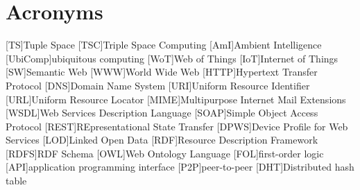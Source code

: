 


\chapter*{Acronyms}

\begin{acronym}
  [TS]{Tuple Space}
  [TSC]{Triple Space Computing}
  [AmI]{Ambient Intelligence}
  [UbiComp]{ubiquitous computing}
  [WoT]{Web of Things}
  [IoT]{Internet of Things}
  [SW]{Semantic Web}
  [WWW]{World Wide Web} %
  [HTTP]{Hypertext Transfer Protocol}
  [DNS]{Domain Name System}
  [URI]{Uniform Resource Identifier}
  [URL]{Uniform Resource Locator}
  [MIME]{Multipurpose Internet Mail Extensions}
  [WSDL]{Web Services Description Language}
  [SOAP]{Simple Object Access Protocol}
  [REST]{REpresentational State Transfer} %
  [DPWS]{Device Profile for Web Services}
  [LOD]{Linked Open Data}
  [RDF]{Resource Description Framework}
  [RDFS]{RDF Schema}
  [OWL]{Web Ontology Language}
  [FOL]{first-order logic}
  [API]{application programming interface}
  [P2P]{peer-to-peer}
  [DHT]{Distributed hash table}
\end{acronym}

